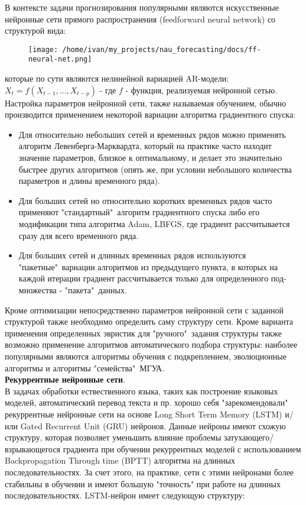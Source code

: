 \documentclass[11pt]{article}
\begin{document}
В контексте задачи прогнозирования популярными являются искусственные нейронные сети прямого распространения (feedforward neural network) со структурой вида:
\begin{figure}[H]
\centering
\texttt{[image: /home/ivan/my\_projects/nau\_forecasting/docs/ff-neural-net.png]}
\label{}
\end{figure}
которые по сути являются нелинейной вариацией AR-модели: $X_t = f(X_{t-1},...,X_{t-p})$ - где $f$ - функция, реализуемая нейронной сетью.
Настройка параметров нейронной сети, также называемая обучением, обычно производится применением некоторой вариации алгоритма градиентного спуска:
\begin{itemize}
\item Для относительно небольших сетей и временных рядов можно применять алгоритм Левенберга-Марквардта, который на практике часто находит значение параметров, близкое к оптимальному, и делает это значительно быстрее других алгоритмов (опять же, при условии небольшого количества параметров и длины временного ряда). 
\item Для больших сетей но относительно коротких временных рядов часто применяют "стандартный"\ алгоритм градиентного спуска либо его модификации типа алгоритма Adam, LBFGS, где градиент рассчитывается сразу для всего временного ряда.
\item Для больших сетей и длинных временных рядов используются "пакетные"\ вариации алгоритмов из предыдущего пункта, в которых на каждой итерации градиент рассчитывается только для определенного под-множества - "пакета"\ данных.
\end{itemize}
Кроме оптимизации непосредственно параметров нейронной сети с заданной структурой также необходимо определить саму структуру сети. Кроме варианта применения определенных эвристик для "ручного"\ задания структуры также возможно применение алгоритмов автоматического подбора структуры: наиболее популярными являются алгоритмы обучения с подкреплением, эволюционные алгоритмы и алгоритмы "семейства"\ МГУА. 
\\
\textbf{Рекуррентные нейронные сети}.
\\
В задачах обработки ествественного языка, таких как построение языковых моделей, автоматический перевод текста и пр. хорошо себя "зарекомендовали" рекуррентные нейронные сети на основе Long Short Term Memory (LSTM) и/или Gated Recurrent Unit (GRU) нейронов. Данные нейроны имеют схожую структуру, которая позволяет уменьшить влияние проблемы затухающего/взрывающегося градиента при обучении рекуррентных моделей с использованием Backpropagation Through time (BPTT) алгоритма на длинных последовательностях. За счет этого, на практике, сети с этими нейронами более стабильны в обучении и имеют большую "точность" при работе на длинных последовательностях. LSTM-нейрон имеет следующую структуру:
\end{document}
